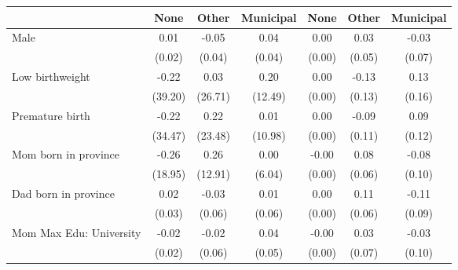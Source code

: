 {
\def\sym#1{\ifmmode^{#1}\else\(^{#1}\)\fi}
\begin{tabular}{l*{6}{c}}
\toprule
                    &\multicolumn{1}{c}{None}&\multicolumn{1}{c}{Other}&\multicolumn{1}{c}{Municipal}&\multicolumn{1}{c}{None}&\multicolumn{1}{c}{Other}&\multicolumn{1}{c}{Municipal}\\
\midrule
Male                &        0.01         &       -0.05         &        0.04         &        0.00         &        0.03         &       -0.03         \\
                    &      (0.02)         &      (0.04)         &      (0.04)         &      (0.00)         &      (0.05)         &      (0.07)         \\
\addlinespace
Low birthweight     &       -0.22         &        0.03         &        0.20         &        0.00         &       -0.13         &        0.13         \\
                    &     (39.20)         &     (26.71)         &     (12.49)         &      (0.00)         &      (0.13)         &      (0.16)         \\
\addlinespace
Premature birth     &       -0.22         &        0.22         &        0.01         &        0.00         &       -0.09         &        0.09         \\
                    &     (34.47)         &     (23.48)         &     (10.98)         &      (0.00)         &      (0.11)         &      (0.12)         \\
\addlinespace
Mom born in province&       -0.26         &        0.26         &        0.00         &       -0.00         &        0.08         &       -0.08         \\
                    &     (18.95)         &     (12.91)         &      (6.04)         &      (0.00)         &      (0.06)         &      (0.10)         \\
\addlinespace
Dad born in province&        0.02         &       -0.03         &        0.01         &        0.00         &        0.11         &       -0.11         \\
                    &      (0.03)         &      (0.06)         &      (0.06)         &      (0.00)         &      (0.06)         &      (0.09)         \\
\addlinespace
Mom Max Edu: University&       -0.02         &       -0.02         &        0.04         &       -0.00         &        0.03         &       -0.03         \\
                    &      (0.02)         &      (0.06)         &      (0.05)         &      (0.00)         &      (0.07)         &      (0.10)         \\

\end{tabular}}
